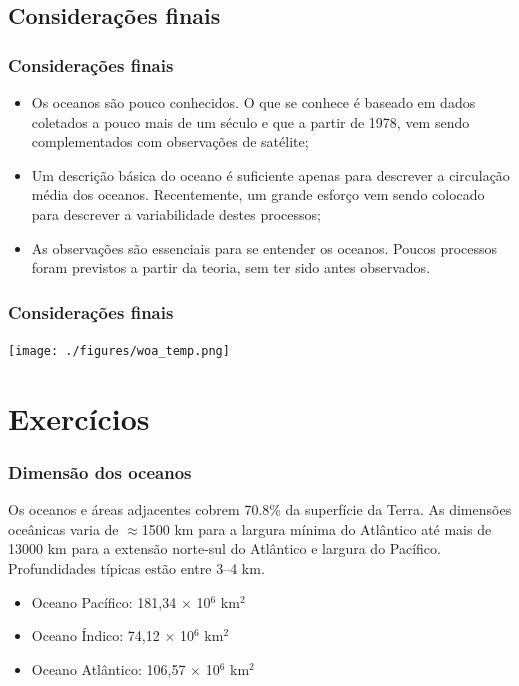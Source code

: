 \subsection{Considerações finais}
\begin{frame}
    \frametitle{Considerações finais}
\small{
    \begin{itemize}[<+-| alert@+>]
        \item Os oceanos são pouco conhecidos.  O que se conhece é baseado em
              dados coletados a pouco mais de um século e que a partir de 1978,
              vem sendo complementados com observações de satélite;
        \item Um descrição básica do oceano é suficiente apenas para descrever
              a circulação média dos oceanos.  Recentemente, um grande esforço
              vem sendo colocado para descrever a variabilidade destes processos;
        \item As observações são essenciais para se entender os oceanos.
              Poucos processos foram previstos a partir da teoria, sem ter sido antes observados.
    \end{itemize}
}
\end{frame}

\begin{frame}
    \frametitle{Considerações finais}
    \centerline{\texttt{[image: ./figures/woa\_temp.png]}}
\end{frame}

\section{Exercícios}
\begin{frame}
    \frametitle{Dimensão dos oceanos}

    \small{Os oceanos e áreas adjacentes cobrem 70.8\% da superfície da Terra.
    As dimensões oceânicas varia de $\approx$1500 km para a largura mínima do
    Atlântico até mais de 13000 km para a extensão norte-sul do Atlântico e
    largura do Pacífico.  Profundidades típicas estão entre 3--4 km.}

    \begin{itemize}[<+-| alert@+>]
        \item Oceano Pacífico: 181,34 $\times$ 10$^6$ km$^2$
        \item Oceano Índico: 74,12 $\times$ 10$^6$ km$^2$
        \item Oceano Atlântico: 106,57 $\times$ 10$^6$ km$^2$
    \end{itemize}
\end{frame}


